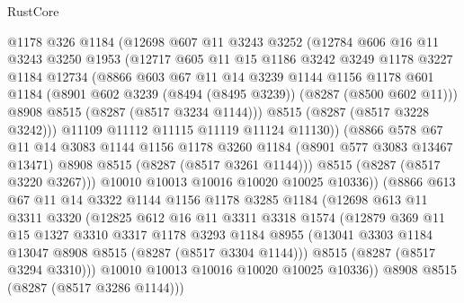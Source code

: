 \begin{lexlean}{RustCore}
\begin{coremodule}
            @1178
            @326
            @1184
            (@12698
              @607
              @11
              @3243
              @3252
              (@12784
                @606
                @16
                @11
                @3243
                @3250
                @1953
                (@12717
                  @605
                  @11
                  @15
                  @1186
                  @3242
                  @3249
                  @1178
                  @3227
                  @1184
                  @12734
                  (@8866
                    @603
                    @67
                    @11
                    @14
                    @3239
                    @1144
                    @1156
                    @1178
                    @601
                    @1184
                    (@8901 @602 @3239 (@8494 (@8495 @3239)) (@8287 (@8500 @602 @11)))
                    @8908
                    @8515
                    (@8287 (@8517 @3234 @1144)))
                  @8515
                  (@8287 (@8517 @3228 @3242)))
                @11109
                @11112
                @11115
                @11119
                @11124
                @11130))
            (@8866
              @578
              @67
              @11
              @14
              @3083
              @1144
              @1156
              @1178
              @3260
              @1184
              (@8901 @577 @3083 @13467 @13471)
              @8908
              @8515
              (@8287 (@8517 @3261 @1144)))
            @8515
            (@8287 (@8517 @3220 @3267)))
          @10010
          @10013
          @10016
          @10020
          @10025
          @10336))
      (@8866
        @613
        @67
        @11
        @14
        @3322
        @1144
        @1156
        @1178
        @3285
        @1184
        (@12698
          @613
          @11
          @3311
          @3320
          (@12825
            @612
            @16
            @11
            @3311
            @3318
            @1574
            (@12879
              @369
              @11
              @15
              @1327
              @3310
              @3317
              @1178
              @3293
              @1184
              @8955
              (@13041 @3303 @1184 @13047 @8908 @8515 (@8287 (@8517 @3304 @1144)))
              @8515
              (@8287 (@8517 @3294 @3310)))
            @10010
            @10013
            @10016
            @10020
            @10025
            @10336))
        @8908
        @8515
        (@8287 (@8517 @3286 @1144)))

\end{coremodule}
\end{lexlean}
